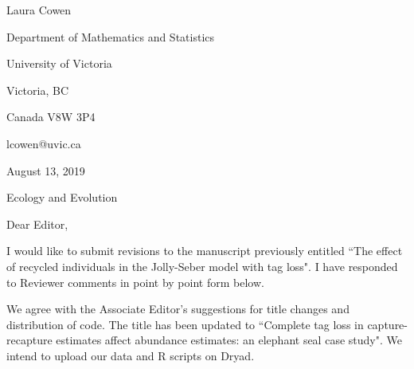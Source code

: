 \documentclass[12pt]{article}
\begin{document}
\setlength{\textheight}{575pt} \setlength{\baselineskip}{23pt}

\noindent\tiny Laura Cowen

\noindent Department of Mathematics and Statistics

\noindent University of Victoria

\noindent Victoria, BC

\noindent Canada V8W 3P4

\noindent lcowen@uvic.ca

\bigskip

\bigskip

\noindent \normalsize August 13, 2019
\bigskip





\noindent Ecology and Evolution


\bigskip


\bigskip
\noindent Dear Editor,

\bigskip

I would like to submit revisions to the manuscript previously entitled ``The effect of recycled individuals in the Jolly-Seber model with tag loss".  I have responded to Reviewer comments in point by point form below. 

\bigskip


We agree with the Associate Editor's suggestions for title changes and distribution of code. The title has been updated to ``Complete tag loss in capture-recapture estimates affect abundance estimates: an elephant seal case study". We intend to upload our data and R scripts on Dryad. 

\bigskip
\end{document}
